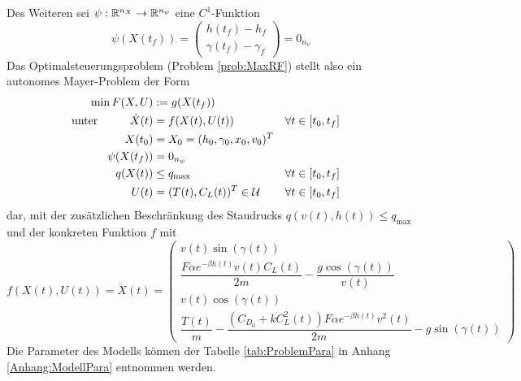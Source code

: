 Des Weiteren sei $\psi : \mathbb{R}^{n_X} \to \mathbb{R}^{n_{\psi}}$ eine $C^1$-Funktion
\[\psi(X(t_f)) = 
\begin{pmatrix}
    h(t_f) - h_f \\ 
    \gamma(t_f) - \gamma_f
\end{pmatrix} = 0_{n_{\psi}}\]
Das Optimalsteuerungsproblem (Problem \ref{prob:MaxRF}) stellt also ein autonomes Mayer-Problem der Form 
\begin{equation} \label{equ:mayer_problem}
    \begin{aligned}
        \min F(X,U) &:= g(X(t_f))  \\
        \text{unter}  \hspace{10mm} \dot{X}(t) &= f(X(t),U(t)) & & \forall t \in [t_0,t_f] \\
        X(t_0) &= X_0 = (h_0,\gamma_0,x_0,v_0)^T & & \\
        \psi(X(t_f)) &= 0_{n_{\psi}} & & \\
        q(X(t)) &\leq q_{\max} & & \forall t \in [t_0,t_f] \\
        U(t) &= (T(t),C_L(t))^T \in \mathcal{U}  & & \forall t \in [t_0,t_f] 
    \end{aligned}
\end{equation}
dar, mit der zusätzlichen Beschränkung des Staudrucks $q(v(t),h(t)) \leq q_{\max} $ und der konkreten Funktion $f$ mit 
\begin{equation} \label{equ:state_space}
    f(X(t),U(t)) = \dot{X}(t) = \begin{pmatrix}
        v(t) \sin(\gamma(t)) \\ 
        \dfrac{F \alpha e^{-\beta h(t)} v(t) C_L(t)}{2m} - \dfrac{g \cos(\gamma(t))}{v(t)} \\ 
        v(t) \cos(\gamma(t)) \\ 
        \dfrac{T(t)}{m} - \dfrac{(C_{D_0} + k C_L^2(t)) F \alpha e^{-\beta h(t)} v^2(t)}{2m} - g \sin(\gamma(t))
    \end{pmatrix}
\end{equation}
Die Parameter des Modells können der Tabelle \ref{tab:ProblemPara} in Anhang \ref{Anhang:ModellPara} entnommen werden.
